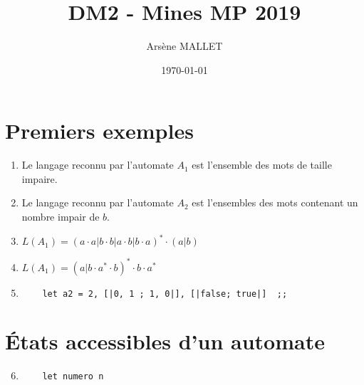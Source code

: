 \documentclass{article}
\title{DM2 - Mines MP 2019}
\date{\today}
\author{Arsène MALLET}
\begin{document}
\thispagestyle{firstpage}

\begin{center}
    \huge\bfseries{\@title}
\end{center}

\section{Premiers exemples}

\begin{enumerate}
    \item Le langage reconnu par l'automate $A_1$ est l'ensemble des mots de taille impaire.
    \item Le langage reconnu par l'automate $A_2$ est l'ensembles des mots contenant un nombre impair de $b$.
    \item $L(A_1) = (a \cdot a|b \cdot b|a \cdot b|b \cdot a)^* \cdot (a|b)$
    \item $L(A_1) = (a|b \cdot a^* \cdot b)^*\cdot b\cdot a^*$
    \item \begin{verbatim}
    let a2 = 2, [|0, 1 ; 1, 0|], [|false; true|]  ;;
    \end{verbatim}
\end{enumerate}

\section{\'Etats accessibles d'un automate}

\begin{enumerate}
    \setcounter{enumi}{5}
    \item \begin{verbatim}
    let numero n 
    \end{verbatim}
\end{enumerate}
\end{document}
